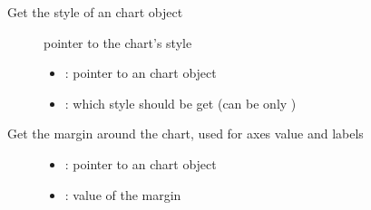 \documentclass[letterpaper,10pt,english]{sphinxmanual}
\begin{document}
\begin{fulllineitems}
\label{\detokenize{object-types/chart:_CPPv418lv_chart_get_stylePK8lv_obj_t16lv_chart_style_t}}%
\pysigstartmultiline
{}\label{\detokenize{object-types/chart:lv__chart_8h_1a05ba2905f74c2274dd94d54de036ceb5}}%
\pysigstopmultiline
Get the style of an chart object \begin{description}
\item[{}] \leavevmode
pointer to the chart’s style 

\item[{}] \leavevmode\begin{itemize}
\item {} 
: pointer to an chart object 

\item {} 
: which style should be get (can be only ) 

\end{itemize}

\end{description}


\end{fulllineitems}


\begin{fulllineitems}
\label{\detokenize{object-types/chart:_CPPv419lv_chart_get_marginP8lv_obj_t}}%
\pysigstartmultiline
{}\label{\detokenize{object-types/chart:lv__chart_8h_1a1c27ea39a6ecea417151b835877d7e17}}%
\pysigstopmultiline
Get the margin around the chart, used for axes value and labels \begin{description}
\item[{}] \leavevmode\begin{itemize}
\item {} 
: pointer to an chart object 

\item {} 
: value of the margin 

\end{itemize}

\end{description}


\end{fulllineitems}
\end{document}
